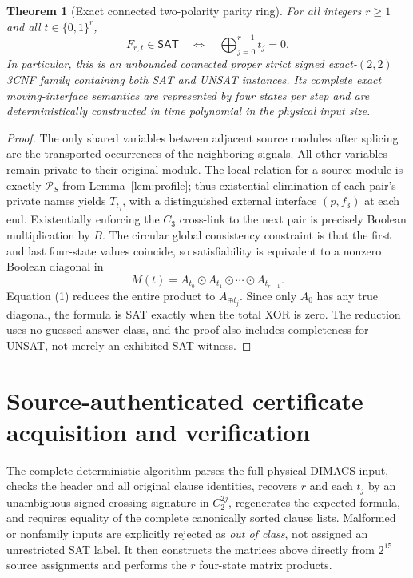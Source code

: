 \documentclass[11pt]{article}
\newtheorem{theorem}{Theorem}
\newcommand{\SAT}{\mathsf{SAT}}
\begin{document}
\begin{theorem}[Exact connected two-polarity parity ring]\label{thm:main}
For all integers $r\ge1$ and all $t\in\{0,1\}^r$,
\[
 \boxed{F_{r,t}\in\SAT\quad\Longleftrightarrow\quad \bigoplus_{j=0}^{r-1}t_j=0.}
\]
In particular, this is an unbounded connected proper strict signed exact-$(2,2)$ 3CNF family containing both SAT and UNSAT instances. Its complete exact moving-interface semantics are represented by four states per step and are deterministically constructed in time polynomial in the physical input size.
\end{theorem}
\begin{proof}
The only shared variables between adjacent source modules after splicing are the transported occurrences of the neighboring signals. All other variables remain private to their original module. The local relation for a source module is exactly $\mathcal P_S$ from Lemma~\ref{lem:profile}; thus existential elimination of each pair's private names yields $T_{t_j}$, with a distinguished external interface $(p,f_3)$ at each end. Existentially enforcing the $C_3$ cross-link to the next pair is precisely Boolean multiplication by $B$. The circular global consistency constraint is that the first and last four-state values coincide, so satisfiability is equivalent to a nonzero Boolean diagonal in
\[
 M(t)=A_{t_0}\odot A_{t_1}\odot\cdots\odot A_{t_{r-1}}.
\]
Equation (1) reduces the entire product to $A_{\oplus t_j}$. Since only $A_0$ has any true diagonal, the formula is SAT exactly when the total XOR is zero. The reduction uses no guessed answer class, and the proof also includes completeness for UNSAT, not merely an exhibited SAT witness.
\end{proof}

\section{Source-authenticated certificate acquisition and verification}
The complete deterministic algorithm parses the full physical DIMACS input, checks the header and all original clause identities, recovers $r$ and each $t_j$ by an unambiguous signed crossing signature in $C_2^{2j}$, regenerates the expected formula, and requires equality of the complete canonically sorted clause lists. Malformed or nonfamily inputs are explicitly rejected as \emph{out of class}, not assigned an unrestricted SAT label. It then constructs the matrices above directly from $2^{15}$ source assignments and performs the $r$ four-state matrix products.
\end{document}
